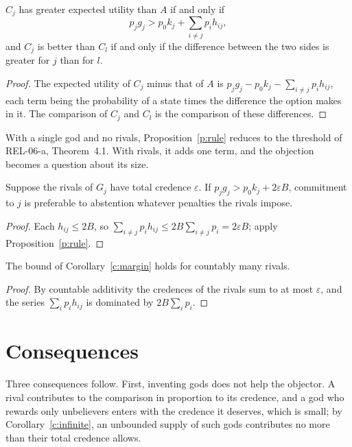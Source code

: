 \documentclass{situationist-preprint}
\begin{document}
\begin{proposition}\label{p:rule}
$C_j$ has greater expected utility than $A$ if and only if
\[
p_j g_j > p_0 k_j + \sum_{i \neq j} p_i h_{ij},
\]
and $C_j$ is better than $C_l$ if and only if the difference between the two sides is greater for $j$ than for $l$.
\end{proposition}

\begin{proof}
The expected utility of $C_j$ minus that of $A$ is $p_j g_j - p_0 k_j - \sum_{i\neq j} p_i h_{ij}$, each term being the probability of a state times the difference the option makes in it. The comparison of $C_j$ and $C_l$ is the comparison of these differences.
\end{proof}

With a single god and no rivals, Proposition~\ref{p:rule} reduces to the threshold of REL-06-a, Theorem~4.1. With rivals, it adds one term, and the objection becomes a question about its size.

\begin{corollary}\label{c:margin}
Suppose the rivals of $G_j$ have total credence $\varepsilon$. If $p_j g_j > p_0 k_j + 2\varepsilon B$, commitment to $j$ is preferable to abstention whatever penalties the rivals impose.
\end{corollary}

\begin{proof}
Each $h_{ij} \leq 2B$, so $\sum_{i \neq j} p_i h_{ij} \leq 2B \sum_{i\neq j} p_i = 2\varepsilon B$; apply Proposition~\ref{p:rule}.
\end{proof}

\begin{corollary}\label{c:infinite}
The bound of Corollary~\ref{c:margin} holds for countably many rivals.
\end{corollary}

\begin{proof}
By countable additivity the credences of the rivals sum to at most $\varepsilon$, and the series $\sum_i p_i h_{ij}$ is dominated by $2B\sum_i p_i$.
\end{proof}

\section{Consequences}

Three consequences follow. First, inventing gods does not help the objector. A rival contributes to the comparison in proportion to its credence, and a god who rewards only unbelievers \citep{MouginSober1994} enters with the credence it deserves, which is small; by Corollary~\ref{c:infinite}, an unbounded supply of such gods contributes no more than their total credence allows.
\end{document}
